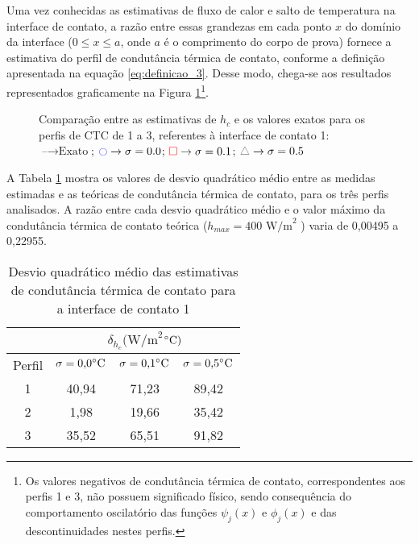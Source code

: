 Uma vez conhecidas as estimativas de fluxo de calor e salto de temperatura na interface de contato, a razão entre essas grandezas em cada ponto $x$ do domínio da interface ($0 \le x \le a$, onde $a$ é o comprimento do corpo de prova) fornece a estimativa do perfil de condutância térmica de contato, conforme a definição apresentada na equação \eqref{eq:definicao_3}. Desse modo, chega-se aos resultados representados graficamente na Figura \ref{figura_ctc_interface_01}\footnote{Os valores negativos de condutância térmica de contato, correspondentes aos perfis 1 e 3, não possuem significado físico, sendo consequência do comportamento oscilatório das funções $\psi_j(x)$ e $\phi_j(x)$ e das descontinuidades nestes perfis.}.
\begin{figure}[H]
	\caption{Comparação entre as estimativas de $h_c$ e os valores exatos para os perfis de CTC de 1 a 3, referentes à interface de contato 1: $\text{--} \rightarrow \text{Exato}$; $\textcolor{blue}{\ocircle} \rightarrow \sigma = 0.0$; $\textcolor{red}{\square} \rightarrow \sigma = 0.1$; $\textcolor{gray}{\triangle} \rightarrow \sigma = 0.5$}
	\label{figura_ctc_interface_01}
\end{figure}

A Tabela \ref{tabela_rms_ctc_interface_1} mostra os valores de desvio quadrático médio entre as medidas estimadas e as teóricas de condutância térmica de contato, para os três perfis analisados. A razão entre cada desvio quadrático médio e o valor máximo da condutância térmica de contato teórica ($h_{max} = 400 \text{ W/m}^2$ \celsius) varia de 0,00495 a 0,22955.
\begin{table}[H]
	\centering
	\caption{Desvio quadrático médio das estimativas de condutância térmica de contato para a interface de contato 1}
	\begin{tabular}{c|c|c|c|}
		\cline{2-4}
		& \multicolumn{3}{c|}{$\delta_{h_c}(\text{W/m}^{2}$$\celsius)$} \\ \hline
		\multicolumn{1}{|c|}{Perfil} & $\sigma = \text{0,0}\celsius$   & $\sigma = \text{0,1}\celsius$    & $\sigma = \text{0,5}\celsius$  \\ \hline
		\multicolumn{1}{|c|}{1}      & 40,94       & 71,23           & 89,42       \\ \hline
		\multicolumn{1}{|c|}{2}      & 1,98       &  19,66      &   35,42    \\ \hline
		\multicolumn{1}{|c|}{3}      & 35,52            &  65,51      & 91,82      \\ \hline
	\end{tabular}
	\label{tabela_rms_ctc_interface_1}
\end{table}

